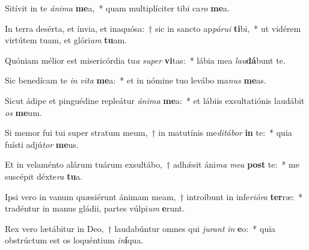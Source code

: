 \item Sitívit in te \textit{á}\textit{ni}\textit{ma} \textbf{me}a,~* quam multiplíciter tibi ca\textit{ro} \textbf{me}a.
\item In terra desérta, et ínvia, et inaquósa:~† sic in sancto ap\textit{pá}\textit{ru}\textit{i} \textbf{ti}bi,~* ut vidérem virtútem tuam, et glóri\textit{am} \textbf{tu}am.
\item Quóniam mélior est misericórdia tu\textit{a} \textit{su}\textit{per} \textbf{vi}tas:~* lábia mea \textit{lau}\textbf{dá}bunt te.
\item Sic benedícam te \textit{in} \textit{vi}\textit{ta} \textbf{me}a:~* et in nómine tuo levábo ma\textit{nus} \textbf{me}as.
\item Sicut ádipe et pinguédine repleátur \textit{á}\textit{ni}\textit{ma} \textbf{me}a:~* et lábiis exsultatiónis laudábit \textit{os} \textbf{me}um.
\item Si memor fui tui super stratum meum,~† in matutínis me\textit{di}\textit{tá}\textit{bor} \textbf{in} te:~* quia fuísti adjú\textit{tor} \textbf{me}us.
\item Et in velaménto alárum tuárum exsultábo,~† adhǽsit áni\textit{ma} \textit{me}\textit{a} \textbf{post} te:~* me suscépit déxte\textit{ra} \textbf{tu}a.
\item Ipsi vero in vanum quæsiérunt ánimam meam,~† introíbunt in infe\textit{ri}\textit{ó}\textit{ra} \textbf{ter}ræ:~* tradéntur in manus gládii, partes vúlpi\textit{um} \textbf{e}runt.
\item Rex vero lætábitur in Deo,~† laudabúntur omnes qui \textit{ju}\textit{rant} \textit{in} \textbf{e}o:~* quia obstrúctum est os loquéntium \textit{in}\textbf{í}qua.
